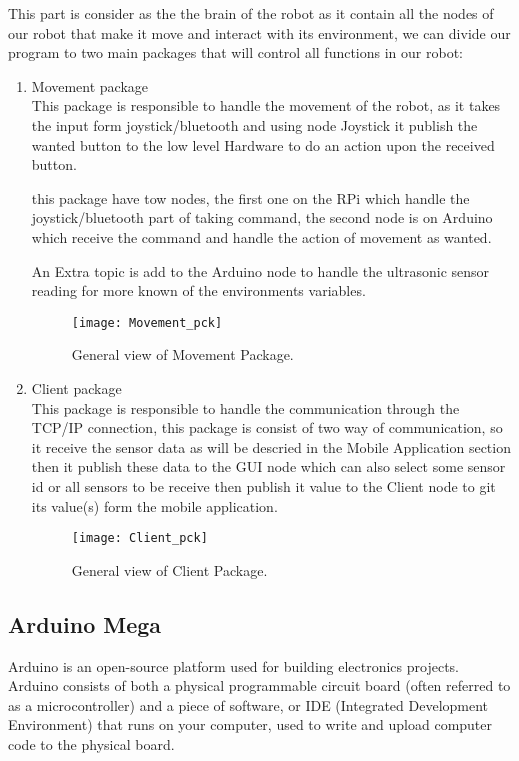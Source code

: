 	This part is consider as the the brain of the robot as it contain all the nodes of our robot that make it move and interact with its environment, we can divide our program to two main packages that will control all functions in our robot:
	
	\begin{enumerate}
		\item Movement package \\ 
			This package is responsible to handle the movement of the robot, as it takes the input form joystick/bluetooth and using node Joystick it publish the wanted button to the low level Hardware to do an action upon the received button.
			
			this package have tow nodes, the first one on the RPi which handle the joystick/bluetooth part of taking command, the second node is on Arduino which receive the command and handle the action of movement as wanted.
			
			An Extra topic is add to the Arduino node to handle the ultrasonic sensor reading for more known of the environments variables. 
			\begin{figure}[h]		
				\centering
				\texttt{[image: Movement\_pck]}
				\caption{General view of Movement Package.}
				\label{Fig:Movement}
			\end{figure}
		\item Client package  \\
			This package is responsible to handle the communication through the TCP/IP connection, this package is consist of two way of communication, so it receive the sensor data as will be descried in the Mobile Application section then it publish these data to the GUI node which can also select some sensor id or all sensors to be receive then publish it value to the Client node to git its value(s) form the mobile application.
			\begin{figure}[h]		
				\centering
				\texttt{[image: Client\_pck]}
				\caption{General view of Client Package.}
				\label{Fig:Client}
			\end{figure}  
	\end{enumerate}

	

\subsection{Arduino Mega}
Arduino is an open-source platform used for building electronics projects. Arduino consists of both a physical programmable circuit board (often referred to as a microcontroller) and a piece of software, or IDE (Integrated Development Environment) that runs on your computer, used to write and upload computer code to the physical board.

